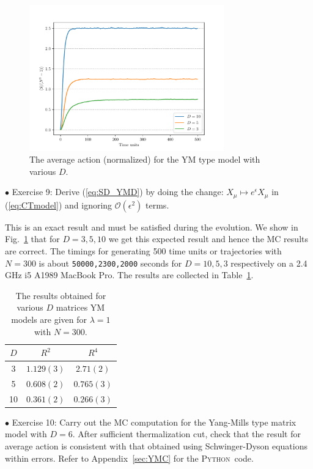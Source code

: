 \documentclass[letter,11pt]{article}
\newcommand{\PY}{\textsc{Python}}
\begin{document}
\begin{figure}[htbp] 
	\centering 
	\includegraphics[width=0.75\textwidth]{figs/act_allD_YM.pdf}
	\caption{\label{fig:YM_allD}The average action (normalized) for the YM type model with various $D$.}
\end{figure}

\begin{mdframed}[backgroundcolor=blue!3] 
	$\bullet$ Exercise 9: Derive (\ref{eq:SD_YMD}) by doing the change: $X_{\mu} \mapsto e^{\epsilon}X_{\mu}$ in (\ref{eq:CTmodel}) and ignoring 
	$\mathcal{O}(\epsilon^{2})$ terms.
\end{mdframed}
This is an exact result and must be satisfied during the evolution. We show in Fig.~\ref{fig:YM_allD} that for 
$D=3,5,10$ we get this expected result and hence the MC results are correct. The timings for generating 500 time units or trajectories 
with $N=300$ is about \texttt{50000,2300,2000} seconds for $D = 10, 5, 3$ respectively on 
a 2.4 GHz i5 A1989 MacBook Pro. The results are collected in Table~\ref{table:D_YM_data}. 
\begin{table}[h!]
	\centering
	\begin{tabular}{||c c c||} 
		\hline
		$D$ & $R^2$ & $R^4$ \\ [0.5ex] 
		\hline\hline
		3 & $1.129(3) $ & $2.71(2) $  \\ 
		5 & $0.608(2) $ & $0.765(3) $  \\
		10 & $0.361(2)$ & $0.266(3)$
		 \\ [1ex] 
		\hline 
	\end{tabular}
\caption{The results obtained for various $D$ matrices YM models are given for $\lambda=1$ with $N=300$.}
\label{table:D_YM_data}
\end{table}
\begin{mdframed}[backgroundcolor=blue!3] 
	$\bullet$ Exercise 10: Carry out the MC computation for the Yang-Mills type matrix model with $D=6$. After sufficient thermalization cut, check that the result for average action is consistent with that obtained using Schwinger-Dyson equations within errors. Refer to Appendix~\ref{sec:YMC} for the \PY~code.
\end{mdframed} 
\end{document}

